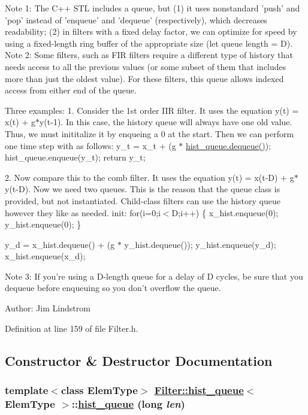 Note 1: The C++ STL includes a queue, but (1) it uses nonstandard 'push' and 'pop' instead of 'enqueue' and 'dequeue' (respectively), which decreases readability; (2) in filters with a fixed delay factor, we can optimize for speed by using a fixed-length ring buffer of the appropriate size (let queue length = D). Note 2: Some filters, such as FIR filters require a different type of history that needs access to all the previous values (or some subset of them that includes more than just the oldest value). For these filters, this queue allows indexed access from either end of the queue.

Three examples: 1. Consider the 1st order IIR filter. It uses the equation y(t) = x(t) + g$\ast$y(t-1). In this case, the history queue will always have one old value. Thus, we must inititalize it by enqueing a 0 at the start. Then we can perform one time step with as follows: y\_\-t = x\_\-t + (g $\ast$ \hyperlink{classFilter_1_1hist__queue_a2}{hist\_\-queue.dequeue()}); hist\_\-queue.enqueue(y\_\-t); return y\_\-t;

2. Now compare this to the comb filter. It uses the equation y(t) = x(t-D) + g$\ast$y(t-D). Now we need two queues. This is the reason that the queue class is provided, but not instantiated. Child-class filters can use the history queue however they like as needed. init: for(i=0;i$<$D;i++) \{ x\_\-hist.enqueue(0); y\_\-hist.enqueue(0); \}

y\_\-d = x\_\-hist.dequeue() + (g $\ast$ y\_\-hist.dequeue()); y\_\-hist.enqueue(y\_\-d); x\_\-hist.enqueue(x\_\-d);

Note 3: If you're using a D-length queue for a delay of D cycles, be sure that you dequeue before enqueuing so you don't overflow the queue.

\begin{Desc}
\item[Author:]Jim Lindstrom \end{Desc}




Definition at line 159 of file Filter.h.

\subsection{Constructor \& Destructor Documentation}
\hypertarget{classFilter_1_1hist__queue_a0}{
\subsubsection[hist\_\-queue]{\setlength{\rightskip}{0pt plus 5cm}template$<$class Elem\-Type$>$ \hyperlink{classFilter_1_1hist__queue}{Filter::hist\_\-queue}$<$ Elem\-Type $>$::\hyperlink{classFilter_1_1hist__queue}{hist\_\-queue} (long {\em len})}}
\label{classFilter_1_1hist__queue_a0}



